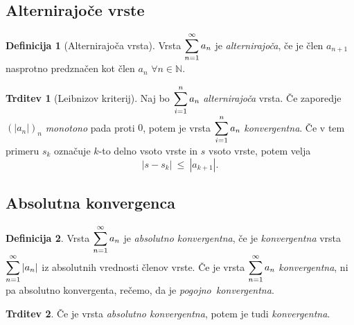 \documentclass[11pt]{article}
\theoremstyle{definition}
\newtheorem{definicija}{Definicija}[section]
\theoremstyle{definition}
\newtheorem{trditev}{Trditev}[section]
\theoremstyle{definition}
\theoremstyle{theorem}
\begin{document}

\subsection{Alternirajoče vrste}
\vspace{0.5cm}

\begin{definicija}[Alternirajoča vrsta]

Vrsta $\mathlarger{\sum_{n=1}^{\infty} a_n}$ je \textit{alternirajoča}, če je člen $a_{n+1}$ nasprotno predznačen kot člen $a_n$ $\forall n \in \mathbb{N}$.

\end{definicija}
\vspace{0.5cm}

\begin{trditev}[Leibnizov kriterij]

Naj bo $\mathlarger{\sum_{i=1}^n a_n}$ \textit{alternirajoča} vrsta. Če zaporedje $(|a_n|)_n$ \textit{monotono} pada proti $0$, potem je vrsta $\mathlarger{\sum_{i=1}^n a_n}$ \textit{konvergentna}. Če v tem primeru $s_k$ označuje $k$-to delno vsoto vrste in $s$ vsoto vrste, potem velja
$$|s - s_k| ~\leq~ |a_{k+1}|.$$

\end{trditev}
\vspace{0.5cm}


\subsection{Absolutna konvergenca}

\begin{definicija}

Vrsta $\mathlarger{\sum_{n=1}^{\infty} a_n}$ je \textit{absolutno konvergentna}, če je \mbox{\textit{konvergentna}} vrsta $\mathlarger{\sum_{n=1}^{\infty} |a_n|}$ iz absolutnih vrednosti členov vrste. Če je vrsta $\mathlarger{\sum_{n=1}^{\infty} a_n}$ \mbox{\textit{konvergentna}}, ni pa absolutno konvergenta, rečemo, da je \mbox{\textit{pogojno konvergentna}}.

\end{definicija}
\vspace{0.5cm}

\begin{trditev}

Če je vrsta \textit{absolutno konvergentna}, potem je tudi \mbox{\textit{konvergentna}}.

\end{trditev}
\vspace{0.5cm}
\end{document}
